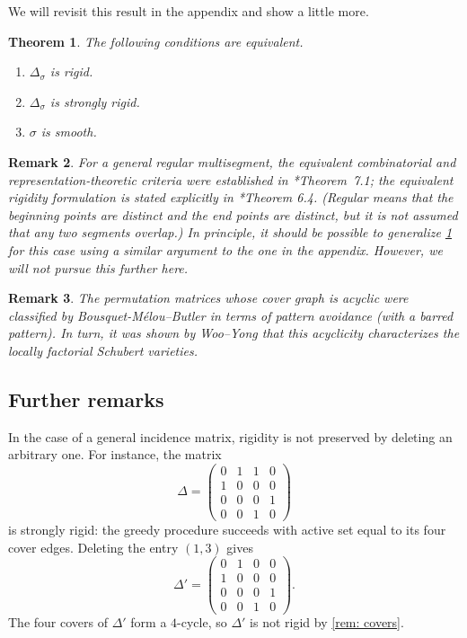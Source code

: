 \documentclass[12pt]{article}
\newtheorem{theorem}{Theorem}[section]
\newtheorem{remark}[theorem]{Remark}
\newcommand{\IM}{\Delta}
\begin{document}
We will revisit this result in the appendix and show a little more.
\begin{theorem} \label{thm: perm}
The following conditions are equivalent.
\begin{enumerate}
\item \label{part: permrigid} $\IM_\sigma$ is rigid.
\item \label{part: permstrong} $\IM_\sigma$ is strongly rigid.
\item \label{part: permsmooth} $\sigma$ is smooth.
\end{enumerate}
\end{theorem}


\begin{remark} \label{rem: LMgen}
For a general regular multisegment, the equivalent combinatorial and representation-theoretic criteria were established in \cite{MR3866895}*{Theorem~7.1};
the equivalent rigidity formulation is stated explicitly in \cite{MR4847251}*{Theorem 6.4}.
(Regular means that the beginning points are distinct and the end points are distinct, but it is not assumed that any two segments overlap.)
In principle, it should be possible to generalize \cref{thm: perm} for this case using a similar argument to the one in the appendix. However, we will not pursue this further here.
\end{remark}

\begin{remark}
The permutation matrices whose cover graph is acyclic were classified by Bousquet-M\'elou--Butler
\cite{MR2376109} in terms of pattern avoidance (with a barred pattern).
In turn, it was shown by Woo--Yong \cite{MR2422304} that this acyclicity characterizes the
locally factorial Schubert varieties.
\end{remark}

\subsection{Further remarks}

In the case of a general incidence matrix, rigidity is not preserved by deleting an arbitrary one. For instance, the matrix
\[
 \IM=\begin{pmatrix}
 0&1&1&0\\1&0&0&0\\0&0&0&1\\0&0&1&0
 \end{pmatrix}
\]
is strongly rigid: the greedy procedure succeeds with active set equal to its four cover
edges.  Deleting the entry $(1,3)$ gives
\[
 \IM'=\begin{pmatrix}
 0&1&0&0\\1&0&0&0\\0&0&0&1\\0&0&1&0
 \end{pmatrix}.
\]
The four covers of $\IM'$ form a $4$-cycle, so $\IM'$ is not rigid by
\cref{rem: covers}.
\end{document}
